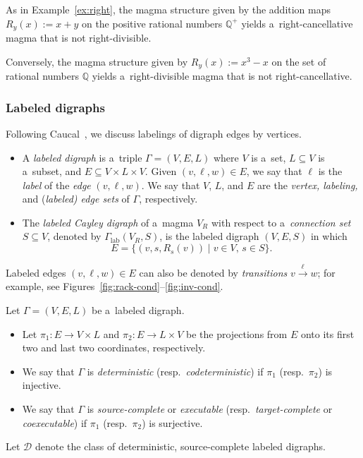\documentclass{jonasart}
\DeclareMathOperator{\lab}{lab}
\newcommand{\Q}{\mathbb{Q}}
\begin{document}
	\begin{example}
		As in Example~\ref{ex:right}, the magma structure given by the addition maps $R_y (x):=x+y$ on the positive rational numbers $\Q^+$ yields a~right-cancellative magma that is not right-divisible.
	\end{example}

	\begin{example}
		Conversely, the magma structure given by $R_y (x):=x^3 -x$ on the set of rational numbers $\Q$ yields a~right-divisible magma that is not right-cancellative.
	\end{example}

	\subsubsection{Labeled digraphs}
    
	Following Caucal~\cite{caucal, caucal2}, we discuss labelings of digraph edges by vertices.

	\begin{definition}
		\phantom{-}
		\begin{itemize}
			\item A \emph{labeled digraph} is a~triple $\Gamma=(V,E,L)$ where $V$ is a~set, $L\subseteq V$ is a~subset, and $E\subseteq V\times L\times V$. Given $(v,\ell,w)\in E$, we say that $\ell$ is the \emph{label} of the \emph{edge} $(v,\ell,w)$. We say that $V$, $L$, and $E$ are the \emph{vertex, labeling,} and (\emph{labeled\textup{)} edge sets} of $\Gamma$, respectively.
			\item The \emph{labeled Cayley digraph} of a~magma $V_R$ with respect to a~\emph{connection set} $S\subseteq V$, denoted by $\Gamma_{\lab}(V_R,S)$, is the labeled digraph $(V,E,S)$ in which
			\[
				E=\{(v,s,R_s(v))\mid v\in V,\, s\in S\}.
			\]
		\end{itemize}
	\end{definition}

	\begin{remark}
		Labeled edges $(v,\ell,w)\in E$ can also be denoted by \emph{transitions} $v\xrightarrow{\ell}w$; for example, see Figures~\ref{fig:rack-cond}--\ref{fig:inv-cond}.
	\end{remark}

	\begin{definition}
		Let $\Gamma=(V,E,L)$ be a~labeled digraph.
		\begin{itemize}
			\item Let $\pi_1:E\to V\times L$ and $\pi_2:E\to L\times V$ be the projections from $E$ onto its first two and last two coordinates, respectively.
			\item We say that $\Gamma$ is \emph{deterministic} (resp.\ \emph{codeterministic}) if $\pi_1$ (resp.\ $\pi_2$) is injective.
			\item We say that $\Gamma$ is \emph{source-complete} or \emph{executable} (resp.\ \emph{target-complete} or \emph{coexecutable}) if $\pi_1$ (resp.\ $\pi_2$) is surjective.
		\end{itemize}
		Let $\mathcal{D}$ denote the class of deterministic, source-complete labeled digraphs.
	\end{definition}
\end{document}

